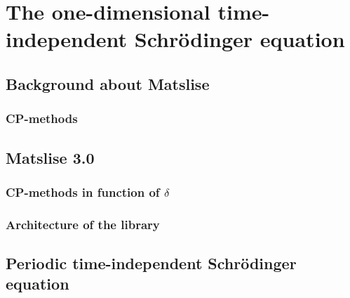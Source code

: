 

\chapter{The one-dimensional time-independent Schrödinger equation}

\section{Background about Matslise}

\subsection{CP-methods}

\section{Matslise 3.0}

\subsection{CP-methods in function of \texorpdfstring{$\delta$}{δ}}

\subsection{Architecture of the \texorpdfstring{\cpp}{C++} library}

\section{Periodic \texorpdfstring{\oneD}{1D} time-independent Schrödinger equation}

\stopchapter
